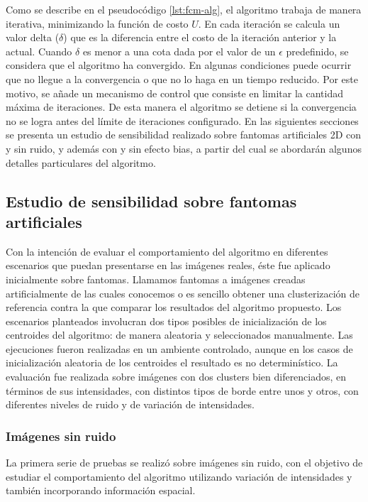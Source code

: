 Como se describe en el pseudocódigo \ref{lst:fcm-alg}, el algoritmo trabaja de manera iterativa, minimizando la función de costo $U$. En cada iteración se calcula un valor delta ($\delta$) que es la diferencia entre el costo de la iteración anterior y la actual. Cuando $\delta$ es menor a una cota dada por el valor de un $\epsilon$ predefinido, se considera que el algoritmo ha convergido. En algunas condiciones puede ocurrir que no llegue a la convergencia o que no lo haga en un tiempo reducido. Por este motivo, se añade un mecanismo de control que consiste en limitar la cantidad máxima de iteraciones. De esta manera el algoritmo se detiene si la convergencia no se logra antes del límite de iteraciones configurado.
En las siguientes secciones se presenta un estudio de sensibilidad realizado sobre fantomas artificiales 2D con y sin ruido, y además con y sin efecto bias, a partir del cual se abordarán algunos detalles particulares del algoritmo.

\subsection{Estudio de sensibilidad sobre fantomas artificiales}
Con la intención de evaluar el comportamiento del algoritmo en diferentes escenarios que puedan presentarse en las imágenes reales, éste fue aplicado inicialmente sobre fantomas. Llamamos fantomas a imágenes creadas artificialmente de las cuales conocemos o es sencillo obtener una clusterización de referencia contra la que comparar los resultados del algoritmo propuesto. Los escenarios planteados involucran dos tipos posibles de inicialización de los centroides del algoritmo: de manera aleatoria y seleccionados manualmente. Las ejecuciones fueron realizadas en un ambiente controlado, aunque en los casos de inicialización aleatoria de los centroides el resultado es no determinístico. La evaluación fue realizada sobre imágenes con dos clusters bien diferenciados, en términos de sus intensidades, con distintos tipos de borde entre unos y otros, con diferentes niveles de ruido y de variación de intensidades.

\subsubsection{Imágenes sin ruido}
La primera serie de pruebas se realizó sobre imágenes sin ruido, con el objetivo de estudiar el comportamiento del algoritmo utilizando variación de intensidades y también incorporando información espacial.

